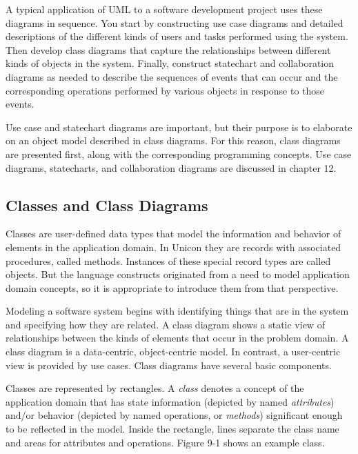 A typical application of UML to a software development project uses
these diagrams in sequence. You start by constructing
use case diagrams and detailed descriptions of the different kinds of
users and tasks performed using the system. Then develop class diagrams
that capture the relationships between different kinds of objects
in the system. Finally, construct statechart and
collaboration diagrams as needed to describe the sequences of events
that can occur and the corresponding operations performed by various
objects in response to those events.

Use case and statechart diagrams are important, but their purpose is
to elaborate on an object model described in class diagrams. For this
reason, class diagrams are
presented first, along with the corresponding programming
concepts. Use case diagrams, statecharts, and collaboration diagrams
are discussed in chapter 12.

\subsection{Classes and Class Diagrams}

Classes are user-defined data types that model the information and
behavior of elements in the application domain. In Unicon they are
records with associated procedures, called methods. Instances of these
special record types are called objects.  But the language constructs
originated from a need to model application domain concepts, so it is
appropriate to introduce them from that perspective.

Modeling a software system begins with identifying things
that are in the system and specifying how they are related. A class
diagram shows a static view of relationships between the kinds of
elements that occur in the problem domain. A class diagram is a
data-centric, object-centric model. In contrast, a
user-centric view is provided by use cases. Class
diagrams have several basic components.

Classes are represented by rectangles. A
{\em class\/} denotes a concept of the
application domain that has state information (depicted by named
\textit{attributes}) and/or behavior (depicted
by named operations, or \textit{methods}) significant
enough to be reflected in the model. Inside the rectangle, lines
separate the class name and areas for attributes and operations. Figure
9-1 shows an example class.

\bigskip

